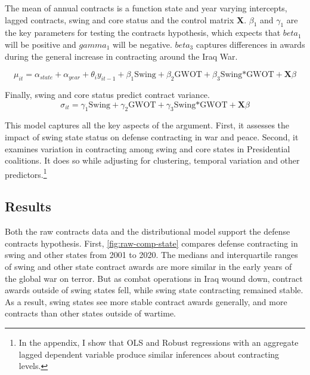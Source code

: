 \documentclass[12pt]{article}
\begin{document}
The mean of annual contracts is a function state and year varying intercepts, lagged contracts, swing and core status and the control matrix \textbf{X}. 
$\beta_1$ and $\gamma_1$ are the key parameters for testing the contracts hypothesis, which expects that $beta_1$ will be positive and $gamma_1$ will be negative. 
$beta_3$ captures differences in awards during the general increase in contracting around the Iraq War. 


\begin{equation}
\mu_{it} = \alpha_{state} + \alpha_{year} + \theta_i y_{it-1} + \beta_1 \mbox{Swing} + \beta_2 \mbox{GWOT} + \beta_3 \mbox{Swing*GWOT} + \textbf{X} \beta
\end{equation}


Finally, swing and core status predict contract variance. 
\begin{equation}
\sigma_{it} = \gamma_1 \mbox{Swing} + \gamma_2 \mbox{GWOT} + \gamma_3 \mbox{Swing*GWOT} + \textbf{X} \beta
\end{equation}


This model captures all the key aspects of the argument. 
First, it assesses the impact of swing state status on defense contracting in war and peace. 
Second, it examines variation in contracting among swing and core states in Presidential coalitions.
It does so while adjusting for clustering, temporal variation and other predictors.\footnote{In the appendix, I show that OLS and Robust regressions with an aggregate lagged dependent variable produce similar inferences about contracting levels.}



\subsection{Results}


Both the raw contracts data and the distributional model support the defense contracts hypothesis. 
First, \autoref{fig:raw-comp-state} compares defense contracting in swing and other states from 2001 to 2020. 
The medians and interquartile ranges of swing and other state contract awards are more similar in the early years of the global war on terror. 
But as combat operations in Iraq wound down, contract awards outside of swing states fell, while swing state contracting remained stable. 
As a result, swing states see more stable contract awards generally, and more contracts than other states outside of wartime. 
\end{document}
